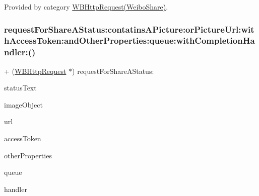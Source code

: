 Provided by category \mbox{\hyperlink{category_w_b_http_request_07_weibo_share_08_ad1a9992eb9534605e3b5d1100a2e693a}{W\+B\+Http\+Request(\+Weibo\+Share)}}.

\mbox{\label{interface_w_b_http_request_ad1a9992eb9534605e3b5d1100a2e693a}} 
\subsubsection{\texorpdfstring{request\+For\+Share\+A\+Status\+:contatins\+A\+Picture\+:or\+Picture\+Url\+:with\+Access\+Token\+:and\+Other\+Properties\+:queue\+:with\+Completion\+Handler\+:()}{requestForShareAStatus:contatinsAPicture:orPictureUrl:withAccessToken:andOtherProperties:queue:withCompletionHandler:()}\hspace{0.1cm}{\footnotesize\ttfamily [3/3]}}
{\footnotesize\ttfamily + (\mbox{\hyperlink{interface_w_b_http_request}{W\+B\+Http\+Request}} $\ast$) request\+For\+Share\+A\+Status\+: \begin{DoxyParamCaption}\item[{(N\+S\+String $\ast$)}]{status\+Text }\item[{contatinsAPicture:(\mbox{\hyperlink{interface_w_b_image_object}{W\+B\+Image\+Object}} $\ast$)}]{image\+Object }\item[{orPictureUrl:(N\+S\+String $\ast$)}]{url }\item[{withAccessToken:(N\+S\+String $\ast$)}]{access\+Token }\item[{andOtherProperties:(N\+S\+Dictionary $\ast$)}]{other\+Properties }\item[{queue:(N\+S\+Operation\+Queue $\ast$)}]{queue }\item[{withCompletionHandler:(W\+B\+Request\+Handler)}]{handler }\end{DoxyParamCaption}}


